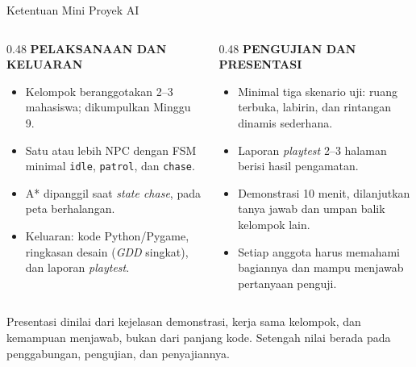 \documentclass[aspectratio=169,10pt]{beamer}
\begin{document}
\begin{frame}{Ketentuan Mini Proyek AI}
\begin{columns}[T,onlytextwidth]
  \begin{column}{0.48\textwidth}
    {\scriptsize\bfseries\color{ubAccent}PELAKSANAAN DAN KELUARAN}\par
    \vspace{0.06cm}
    \begin{itemize}
      \item Kelompok beranggotakan 2--3 mahasiswa; dikumpulkan Minggu 9.
      \item Satu atau lebih NPC dengan FSM minimal \texttt{idle},
            \texttt{patrol}, dan \texttt{chase}.
      \item A* dipanggil saat \emph{state chase}, pada peta berhalangan.
      \item Keluaran: kode Python/Pygame, ringkasan desain (\emph{GDD}
            singkat), dan laporan \emph{playtest}.
    \end{itemize}
  \end{column}
  \begin{column}{0.48\textwidth}
    {\scriptsize\bfseries\color{ubAccent}PENGUJIAN DAN PRESENTASI}\par
    \vspace{0.06cm}
    \begin{itemize}
      \item Minimal tiga skenario uji: ruang terbuka, labirin, dan rintangan
            dinamis sederhana.
      \item Laporan \emph{playtest} 2--3 halaman berisi hasil pengamatan.
      \item Demonstrasi 10 menit, dilanjutkan tanya jawab dan umpan balik
            kelompok lain.
      \item Setiap anggota harus memahami bagiannya dan mampu menjawab
            pertanyaan penguji.
    \end{itemize}
  \end{column}
\end{columns}
\vspace{0.14cm}
\begin{kotak}
Presentasi dinilai dari kejelasan demonstrasi, kerja sama kelompok, dan
kemampuan menjawab, bukan dari panjang kode. Setengah nilai berada pada
penggabungan, pengujian, dan penyajiannya.
\end{kotak}
\end{frame}
\end{document}
